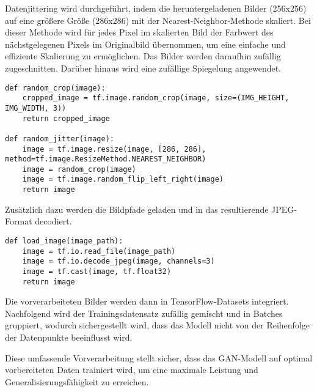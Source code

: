 Datenjittering wird durchgeführt, indem die heruntergeladenen Bilder (256x256) auf eine größere Größe (286x286) mit der Nearest-Neighbor-Methode skaliert. Bei dieser Methode wird für jedes Pixel im skalierten Bild der Farbwert des nächstgelegenen Pixels im Originalbild übernommen, um eine einfache und effiziente Skalierung zu ermöglichen. Das Bilder werden daraufhin zufällig zugeschnitten. Darüber hinaus wird eine zufällige Spiegelung angewendet.

\begin{lstlisting}[language=pyhaff, caption={Vorverarbeitung des Datensatzes: Jittering}, label={cod:jittering}]
def random_crop(image):
    cropped_image = tf.image.random_crop(image, size=(IMG_HEIGHT, IMG_WIDTH, 3))
    return cropped_image

def random_jitter(image):
    image = tf.image.resize(image, [286, 286], method=tf.image.ResizeMethod.NEAREST_NEIGHBOR)
    image = random_crop(image)
    image = tf.image.random_flip_left_right(image)
    return image
\end{lstlisting}

Zusätzlich dazu werden die Bildpfade geladen und in das resultierende JPEG-Format decodiert.

\begin{lstlisting}[language=pyhaff, caption={Vorverarbeitung des Datensatzes: Jittering}, label={cod:jittering}]
def load_image(image_path):
    image = tf.io.read_file(image_path)
    image = tf.io.decode_jpeg(image, channels=3)
    image = tf.cast(image, tf.float32)
    return image
\end{lstlisting}

Die vorverarbeiteten Bilder werden dann in TensorFlow-Datasets integriert. Nachfolgend wird der Trainingsdatensatz zufällig gemischt und in Batches gruppiert, wodurch sichergestellt wird, dass das Modell nicht von der Reihenfolge der Datenpunkte beeinflusst wird.
\newpage 


Diese umfassende Vorverarbeitung stellt sicher, dass das GAN-Modell auf optimal vorbereiteten Daten trainiert wird, um eine maximale Leistung und Generalisierungsfähigkeit zu erreichen.